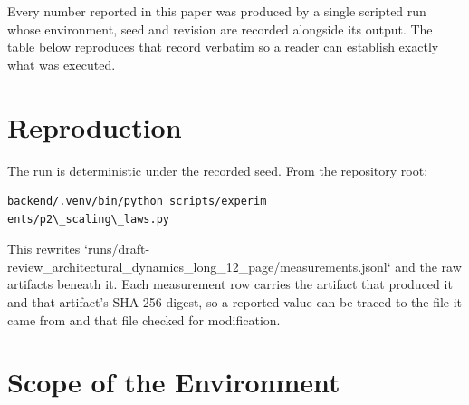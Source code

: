 \documentclass{article}
\begin{document}
Every number reported in this paper was produced by a single scripted run whose environment, seed and revision are recorded alongside its output. The table below reproduces that record verbatim so a reader can establish exactly what was executed.
\begin{table}[htbp]
\centering
{}
\end{table}


\section{Reproduction}


The run is deterministic under the recorded seed. From the repository root:


\begin{scriptsize}
\begin{verbatim}
backend/.venv/bin/python scripts/experim
ents/p2\_scaling\_laws.py
\end{verbatim}
\end{scriptsize}


This rewrites `runs/draft-review\_architectural\_dynamics\_long\_12\_page/measurements.jsonl` and the raw artifacts beneath it. Each measurement row carries the artifact that produced it and that artifact's SHA-256 digest, so a reported value can be traced to the file it came from and that file checked for modification.


\section{Scope of the Environment}
\end{document}
